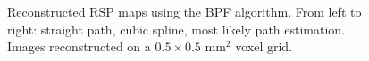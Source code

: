 \documentclass[11pt,a4paper]{article}
\begin{document}
\begin{figure}[!htb]
  \hspace*{\fill}%
  \hfill%
  \hfill
  \hspace*{\fill}
  \caption{Reconstructed RSP maps using the BPF algorithm. From left to right: straight path, cubic spline, most likely path estimation. Images reconstructed on a $0.5 \times 0.5$ mm$^2$ voxel grid.}
  \label{fig:bpfRSP}
\end{figure}
\end{document}
